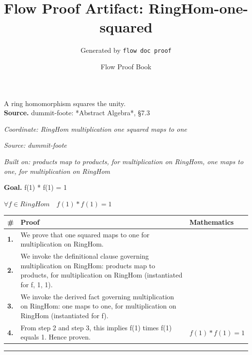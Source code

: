 \documentclass[11pt]{article}
\title{Flow Proof Artifact: RingHom-one-squared}
\author{Generated by \texttt{flow doc proof}}
\date{Flow Proof Book}
\theoremstyle{definition}
\begin{document}
\maketitle
A ring homomorphism squares the unity.\\[0.5em]
\textbf{Source.} dummit-foote: *Abstract Algebra*, §7.3\\[0.5em]
\bigskip
{}\par
\smallskip\noindent\textit{Coordinate: RingHom \cdot multiplication \cdot one squared maps to one}\par
\smallskip\noindent\textit{Source: dummit-foote}\par
\smallskip\noindent\textit{Built on: products map to products, for multiplication on RingHom, one maps to one, for multiplication on RingHom}\par
\medskip
\noindent\textbf{Goal.} f(1) * f(1) = 1\par
\noindent$\displaystyle \forall f \in RingHom\quad f(1) * f(1) = 1$\par
\medskip
\noindent
\begin{tabular}{@{} >{\raggedright\arraybackslash}p{} >{\raggedright\arraybackslash}p{} >{\raggedleft\arraybackslash}p{} @{}}
\textbf{\#} & \textbf{Proof} & \textbf{Mathematics} \\
\midrule
\textbf{1.} & We prove that one squared maps to one for multiplication on RingHom. & \\[0.45em]
\textbf{2.} & We invoke the definitional clause governing multiplication on RingHom: products map to products, for multiplication on RingHom (instantiated for f, 1, 1). & \\[0.45em]
\textbf{3.} & We invoke the derived fact governing multiplication on RingHom: one maps to one, for multiplication on RingHom (instantiated for f). & \\[0.45em]
\textbf{4.} & From step 2 and step 3, this implies f(1) times f(1) equals 1. Hence proven. & $\displaystyle f(1) * f(1) = 1$ \\[0.45em]
\bottomrule
\end{tabular}
\label{thm:RingHom-multiplication-one_squared_maps_to_one}
\par\medskip\hrule
\end{document}
